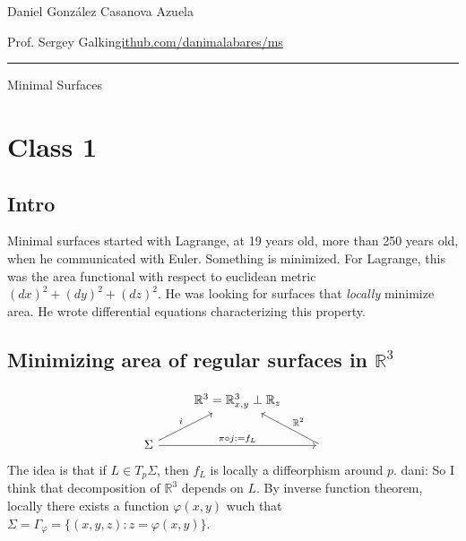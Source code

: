 





\begin{minipage}{\textwidth}
	\begin{minipage}{1\textwidth}
		\hfill Daniel González Casanova Azuela
		
		{\small Prof. Sergey Galkin\hfill\href{https://github.com/danimalabares/ms}{github.com/danimalabares/ms}}
	\end{minipage}
\end{minipage}\vspace{.2cm}\hrule
\vspace{1em}
{\Huge Minimal Surfaces}

\tableofcontents

\section{Class 1}

\subsection{Intro}

Minimal surfaces started with Lagrange, at 19 years old, more than 250 years old, when he communicated with Euler. Something is minimized. For Lagrange, this was the area functional with respect to euclidean metric \((dx)^2+(dy)^2+(dz)^2\). He was looking for surfaces that \textit{locally} minimize area. He wrote differential equations characterizing this property.

\subsection{Minimizing area of regular surfaces in \(\mathbb{R}^3\)}

\[\begin{tikzcd}
&\mathbb{R}^3=\mathbb{R}^3_{x,y}\perp \mathbb{R}_z\\
\Sigma\arrow[rr,"\pi \circ j:=f_L"]\arrow[ur,"i"]&&\arrow[ul,"\mathbb{R}^2",swap]
\end{tikzcd}\]
The idea is that if \(L \in T_p \Sigma\), then \(f_L\) is locally a diffeorphism around \(p\). {\color{6}dani: So I think that decomposition of \(\mathbb{R}^3\) depends on \(L\).} By inverse function theorem, locally there exists a function \(\varphi(x,y)\) wuch that \(\Sigma=\Gamma_\varphi=\{(x,y,z): z=\varphi(x,y)\}\).

